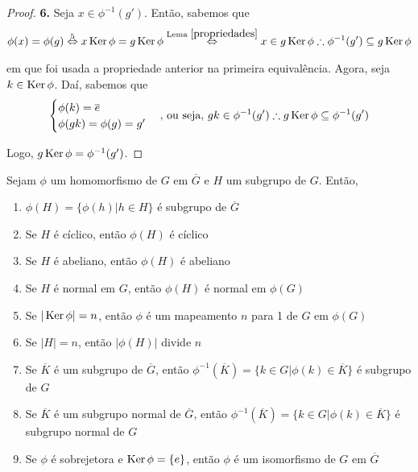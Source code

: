\begin{proof}
		\par\vspace{0.3cm}\hspace{17pt}\textbf{6.} Seja $x\in\phi^{-1}(g')$. Então, sabemos que
		\begin{align*}
		\phi(x) = \phi(g) \overset{5}{\Leftrightarrow} x\operatorname{Ker}\phi = g\operatorname{Ker}\phi \overset{\text{Lema }\eqref{propriedades}}{\Leftrightarrow} x\in g\operatorname{Ker}\phi \therefore \phi^{-1}(g') \subseteq g\operatorname{Ker}\phi
		\end{align*}
		
		\par\vspace{0.3cm} em que foi usada a propriedade anterior na primeira equivalência. Agora, seja $k\in\operatorname{Ker}\phi$. Daí, sabemos que
		\begin{align*}
		\begin{cases} \phi(k) = \overline{e} \\ 
		\phi(gk) = \phi(g) = g'
		\end{cases} \text{, ou seja, $gk\in \phi^{-1}(g')$}\therefore g\operatorname{Ker}\phi \subseteq \phi^{-1}(g')
		\end{align*}
		
		\par\vspace{0.3cm} Logo, $g\operatorname{Ker}\phi = \phi^{-1}(g')$.
		
	\end{proof}
	
	\begin{theorem}
		\label{homomorfismos em subgrupos}
		Sejam $\phi$ um homomorfismo de $G$ em $\overline{G}$ e $H$ um subgrupo de $G$. Então,
		
		\begin{enumerate}
			\item $\phi(H) = \{ \phi(h) | h\in H \}$ é subgrupo de $\overline{G}$
			\item Se $H$ é cíclico, então $\phi(H)$ é cíclico
			\item Se $H$ é abeliano, então $\phi(H)$ é abeliano
			\item Se $H$ é normal em $G$, então $\phi(H)$ é normal em $\phi(G)$
			\item Se $|\operatorname{Ker}\phi| = n$, então $\phi$ é um mapeamento $n$ para 1 de $G$ em $\phi (G)$
			\item Se $|H| = n$, então $|\phi(H)|$ divide $n$
			\item Se $\overline{K}$ é um subgrupo de $\overline{G}$, então $\phi^{-1}(\overline{K}) = \{ k\in G | \phi(k)\in \overline{K} \}$ é subgrupo de $G$
			\item Se $\overline{K}$ é um subgrupo normal de $\overline{G}$, então $\phi^{-1}(\overline{K}) = \{ k\in G | \phi(k)\in \overline{K} \}$ é subgrupo normal de $G$
			\item Se $\phi$ é sobrejetora e $\operatorname{Ker}\phi = \{e\}$, então $\phi$ é um isomorfismo de $G$ em $\overline{G}$
		\end{enumerate}
		
	\end{theorem}
	
